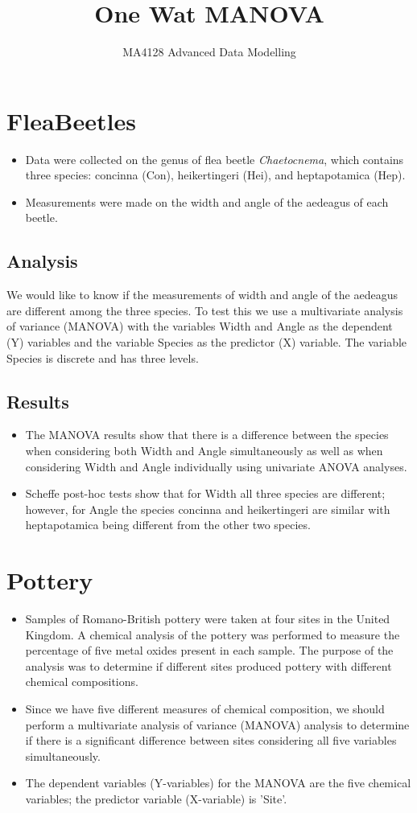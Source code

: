 \documentclass[11pt]{article} %
\title{One Wat MANOVA}
\author{MA4128 Advanced Data Modelling}
\begin{document}
\section{FleaBeetles}

\begin{itemize}
\item Data were collected on the genus of flea beetle \textit{Chaetocnema}, which contains three species: concinna (Con), heikertingeri (Hei), and heptapotamica (Hep). \item Measurements were made on the width and angle of the aedeagus of each beetle.
\end{itemize}


\bigskip
\subsection{Analysis}
We would like to know if the measurements of width and angle of the aedeagus are different among the three species. To test this we use a multivariate analysis of variance (MANOVA) with the variables Width and Angle as the dependent (Y) variables and the variable Species as the predictor (X) variable. The variable Species is discrete and has three levels.

\bigskip
\subsection{Results}
\begin{itemize}
\item The MANOVA results show that there is a difference between the species when considering both Width and Angle simultaneously as well as when considering Width and Angle individually using univariate ANOVA analyses.
\item Scheffe post-hoc tests show that for Width all three species are different; however, for Angle the species concinna and heikertingeri are similar with heptapotamica being different from the other two species. 
\end{itemize}


\newpage

\section{Pottery}
\begin{itemize}
\item Samples of Romano-British pottery were taken at four sites in the United Kingdom. A chemical analysis of the pottery was performed to measure the percentage of five metal oxides present in each sample. The purpose of the analysis was to determine if different sites produced pottery with different chemical compositions.
\item Since we have five different measures of chemical composition, we should perform a multivariate analysis of variance (MANOVA) analysis to determine if there is a significant difference between sites considering all five variables simultaneously.
\item The dependent variables (Y-variables) for the MANOVA are the five chemical variables; the predictor variable (X-variable) is 'Site'.
\end{itemize}
\end{document}
